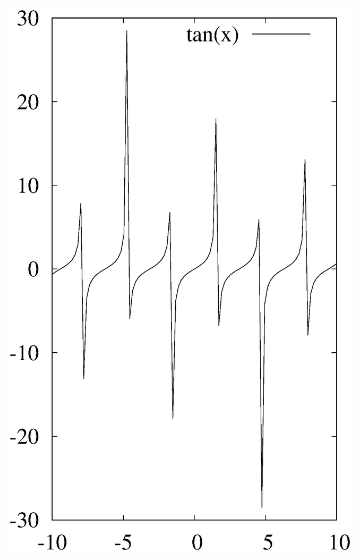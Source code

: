\documentclass[journal=jacsat,manuscript=article]{achemso}
\begin{document}
\begin{figure}[ht]
\begin{subfigure}{0.3\textwidth}
\includegraphics [width=\textwidth]{tan.eps}

\end{subfigure}
\end{figure}
\end{document}
